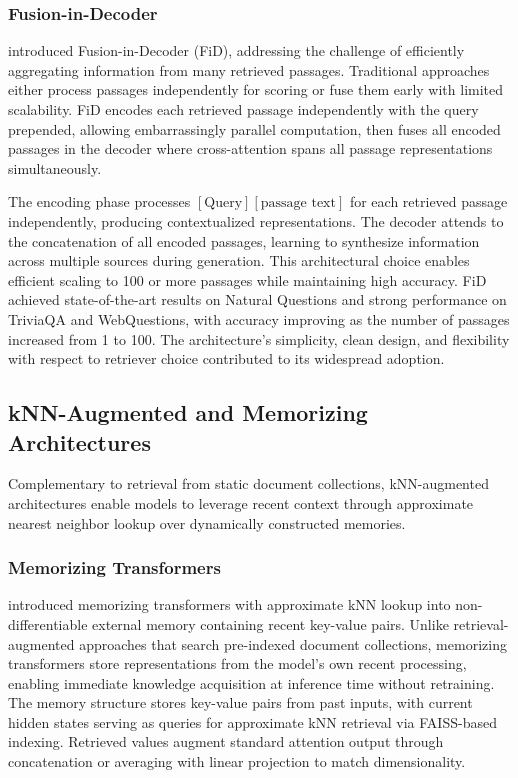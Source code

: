 \documentclass[11pt,letterpaper]{article}
\begin{document}
\subsubsection{Fusion-in-Decoder}

\cite{izacard2020leveraging} introduced Fusion-in-Decoder (FiD), addressing the challenge of efficiently aggregating information from many retrieved passages. Traditional approaches either process passages independently for scoring or fuse them early with limited scalability. FiD encodes each retrieved passage independently with the query prepended, allowing embarrassingly parallel computation, then fuses all encoded passages in the decoder where cross-attention spans all passage representations simultaneously.

The encoding phase processes $[\text{Query}][\text{passage text}]$ for each retrieved passage independently, producing contextualized representations. The decoder attends to the concatenation of all encoded passages, learning to synthesize information across multiple sources during generation. This architectural choice enables efficient scaling to 100 or more passages while maintaining high accuracy. FiD achieved state-of-the-art results on Natural Questions and strong performance on TriviaQA and WebQuestions, with accuracy improving as the number of passages increased from 1 to 100. The architecture's simplicity, clean design, and flexibility with respect to retriever choice contributed to its widespread adoption.

\subsection{kNN-Augmented and Memorizing Architectures}

Complementary to retrieval from static document collections, kNN-augmented architectures enable models to leverage recent context through approximate nearest neighbor lookup over dynamically constructed memories.

\subsubsection{Memorizing Transformers}

\cite{wu2022memorizing} introduced memorizing transformers with approximate kNN lookup into non-differentiable external memory containing recent key-value pairs. Unlike retrieval-augmented approaches that search pre-indexed document collections, memorizing transformers store representations from the model's own recent processing, enabling immediate knowledge acquisition at inference time without retraining. The memory structure stores key-value pairs from past inputs, with current hidden states serving as queries for approximate kNN retrieval via FAISS-based indexing. Retrieved values augment standard attention output through concatenation or averaging with linear projection to match dimensionality.
\end{document}
